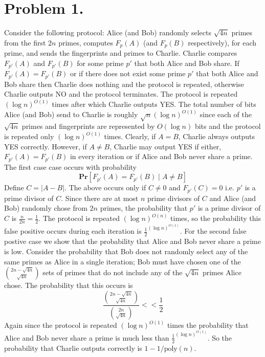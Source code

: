 \documentclass[12pt]{article}
\begin{document}
\pagestyle{plain}
\titleformat{\subsection}[runin]
  {\normalfont\large\bfseries}{\thesubsection}{1em}{}
\titleformat{\subsubsection}[runin]
  {\normalfont\large\bfseries}{\thesubsubsection}{1em}{}

\section*{Problem 1.}
Consider the following protocol: Alice (and Bob) randomly selects $\sqrt{4n}$
primes from the first $2n$ primes, computes $F_p(A)$ (and $F_p(B)$ respectively),
for each prime, and sends the fingerprints and primes to Charlie.
Charlie compares $F_{p'}(A)$ and $F_{p'}(B)$ for some prime $p'$ that both
Alice and Bob share. If $F_{p'}(A) = F_{p'}(B)$ or if there does not exist some
prime $p'$ that both Alice and Bob share then Charlie does nothing and the
protocol is repeated, otherwise Charlie outputs NO and the protocol terminates.
The protocol is repeated $(\log{n})^{O(1)}$ times after which Charlie outputs YES.
The total number of bits Alice (and Bob) send to Charlie is roughly
$\sqrt{n}(\log{n})^{O(1)}$ since each of the $\sqrt{4n}$ primes and fingerprints
are represented by $O(\log{n})$ bits and the protocol is repeated only
$(\log{n})^{O(1)}$ times. Clearly, if $A = B$, Charlie always outputs YES
correctly. However, if $A \neq B$, Charlie may output YES if either,
$F_{p'}(A) = F_{p'}(B)$ in every iteration or if Alice and Bob never share
a prime. The first case case occurs with probability
$$\textbf{Pr}[F_{p'}(A) = F_{p'}(B) \mid A \neq B]$$
Define $C = |A-B|$. The above occurs only if $C \neq 0$ and $F_{p'}(C) = 0$
i.e. $p'$ is a prime divisor of $C$. Since there are at most $n$ prime divisors
of $C$ and Alice (and Bob) randomly chose from $2n$ primes, the probability
that $p'$ is a prime divisor of $C$ is $\frac{n}{2n} = \frac{1}{2}$.
The protocol is repeated $(\log{n})^{O(n)}$ times, so the probability this false
positive occurs during each iteration is $\frac{1}{2}^{(\log{n})^{O(1)}}$.
For the second false postive case we show that the
probability that Alice and Bob never share a prime is low. Consider the
probability that Bob does not randomly
select any of the same primes as Alice in a single iteration; Bob must have
chosen one of the $2n-\sqrt{4n} \choose \sqrt{4n}$ sets of primes that do not
include any of the $\sqrt{4n}$ primes Alice chose. The probability that this
occurs is
$$\frac{{2n-\sqrt{4n} \choose \sqrt{4n}}}{{2n \choose \sqrt{4n}}} << \frac{1}{2} $$
Again since the protocol is repeated $(\log{n})^{O(1)}$ times the probability
that Alice and Bob never share a prime is much less than
$\frac{1}{2}^{(\log{n})^{O(1)}}$. So the probability that
Charlie outputs correctly is $1-1/\text{poly}(n)$.
\end{document}
